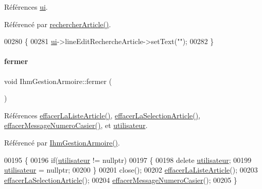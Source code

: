 Références \hyperlink{class_ihm_gestion_armoire_a793a2816dc21b3161566138d2af5a8b9}{ui}.



Référencé par \hyperlink{class_ihm_gestion_armoire_a594f25b58b70700e19e3e7f567325c40}{rechercher\+Article()}.


\begin{DoxyCode}
00280 \{
00281     \hyperlink{class_ihm_gestion_armoire_a793a2816dc21b3161566138d2af5a8b9}{ui}->lineEditRechercheArticle->setText(\textcolor{stringliteral}{""});
00282 \}
\end{DoxyCode}
\mbox{\label{class_ihm_gestion_armoire_a7fef1d21e4dcce9c4550d33b15e8dc29}} 
\paragraph{\texorpdfstring{fermer}{fermer}}
{\footnotesize\ttfamily void Ihm\+Gestion\+Armoire\+::fermer (\begin{DoxyParamCaption}{ }\end{DoxyParamCaption})\hspace{0.3cm}{\ttfamily [slot]}}



Références \hyperlink{class_ihm_gestion_armoire_a65cf47ddfe3942435b5f3bf40578d96a}{effacer\+La\+Liste\+Article()}, \hyperlink{class_ihm_gestion_armoire_aa432c67c648097bbec288694077d83e6}{effacer\+La\+Selection\+Article()}, \hyperlink{class_ihm_gestion_armoire_a38dab807125ddb3baecf9345906e3c4b}{effacer\+Message\+Numero\+Casier()}, et \hyperlink{class_ihm_gestion_armoire_aa14adf3863cf09947411fc33e413076c}{utilisateur}.



Référencé par \hyperlink{class_ihm_gestion_armoire_a7aa5e1514dd5d1b5648a2f6dd36970f9}{Ihm\+Gestion\+Armoire()}.


\begin{DoxyCode}
00195 \{
00196     \textcolor{keywordflow}{if}(\hyperlink{class_ihm_gestion_armoire_aa14adf3863cf09947411fc33e413076c}{utilisateur} != \textcolor{keyword}{nullptr})
00197     \{
00198         \textcolor{keyword}{delete} \hyperlink{class_ihm_gestion_armoire_aa14adf3863cf09947411fc33e413076c}{utilisateur};
00199         \hyperlink{class_ihm_gestion_armoire_aa14adf3863cf09947411fc33e413076c}{utilisateur} = \textcolor{keyword}{nullptr};
00200     \}
00201     close();
00202     \hyperlink{class_ihm_gestion_armoire_a65cf47ddfe3942435b5f3bf40578d96a}{effacerLaListeArticle}();
00203     \hyperlink{class_ihm_gestion_armoire_aa432c67c648097bbec288694077d83e6}{effacerLaSelectionArticle}();
00204     \hyperlink{class_ihm_gestion_armoire_a38dab807125ddb3baecf9345906e3c4b}{effacerMessageNumeroCasier}();
00205 \}
\end{DoxyCode}
\mbox{\label{class_ihm_gestion_armoire_a527e704e792dd5634b3c0a738a922429}} 
